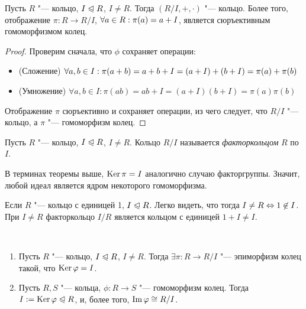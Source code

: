 \begin{theorem}
	Пусть $R$ "--- кольцо, $I \trianglelefteqslant R$, $I \ne R$. Тогда $(R / I, +, \cdot)$ "--- кольцо. Более того, отображение $\pi: R \to R/I$, $\forall a \in R: \pi(a) \hm= a + I$, является сюръективным гомоморфизмом колец.
\end{theorem}

\begin{proof}
	Проверим сначала, что $\phi$ сохраняет операции:
	\begin{itemize}
		\item (Сложение) $\forall a, b \in I: \pi(a + b) = a + b + I = (a + I) + (b + I) \hm= \pi(a) + \pi(b)$
		\item (Умножение) $\forall a, b \in I: \pi(ab) = ab + I = (a + I)(b + I) = \pi(a)\pi(b)$
	\end{itemize}

	Отображение $\pi$ сюръективно и сохраняет операции, из чего следует, что $R / I$ "--- кольцо, а $\pi$ "--- гомоморфизм колец.
\end{proof}

\begin{definition}
	Пусть $R$ "--- кольцо, $I \trianglelefteqslant R$, $I \ne R$. Кольцо $R / I$ называется \textit{факторкольцом} $R$ по $I$.
\end{definition}

\begin{note}
	В терминах теоремы выше, $\operatorname{Ker}\pi = I$ аналогично случаю факторгруппы. Значит, любой идеал является ядром некоторого гомоморфизма.
\end{note}

\begin{note}
	Если $R$ "--- кольцо с единицей 1, $I \trianglelefteqslant R$. Легко видеть, что тогда $I \ne R \hm\Lra 1 \not\in I$. При $I \ne R$ факторкольцо $I / R$ является кольцом с единицей $1 + I \ne I$.
\end{note}

\begin{theorem}~
	\begin{enumerate}
		\item Пусть $R$ "--- кольцо, $I \trianglelefteqslant R$, $I \ne R$. Тогда $\exists \pi: R \to R / I$ "--- эпиморфизм колец такой, что $\ke\phi \hm= I$.
		\item Пусть $R, S$ "--- кольца, $\phi: R \to S$ "--- гомоморфизм колец. Тогда $I \hm{:=} \ke\phi \normal R$, и, более того, $\operatorname{Im}\varphi \cong R / I$.
	\end{enumerate}
\end{theorem}

